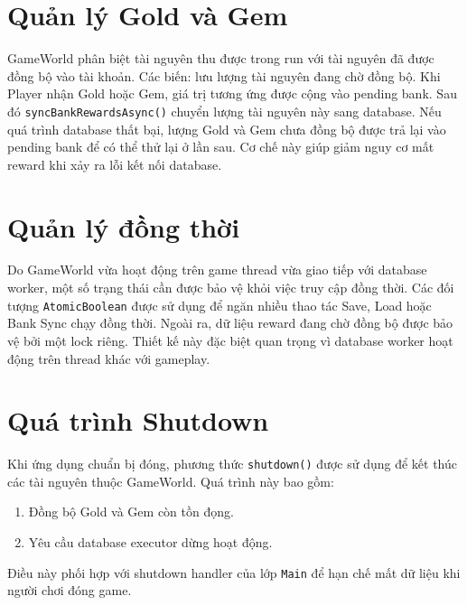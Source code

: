 \documentclass[12pt,a4paper]{report}
\begin{document}
    \section{Quản lý Gold và Gem}
    GameWorld phân biệt tài nguyên thu được trong run với tài nguyên
    đã được đồng bộ vào tài khoản.
    Các biến:
    lưu lượng tài nguyên đang chờ đồng bộ.
    Khi Player nhận Gold hoặc Gem, giá trị tương ứng được cộng vào
    pending bank.
    Sau đó \texttt{syncBankRewardsAsync()} chuyển lượng tài nguyên
    này sang database.
    Nếu quá trình database thất bại, lượng Gold và Gem chưa đồng bộ
    được trả lại vào pending bank để có thể thử lại ở lần sau.
    Cơ chế này giúp giảm nguy cơ mất reward khi xảy ra lỗi kết nối
    database.


    \section{Quản lý đồng thời}
    Do GameWorld vừa hoạt động trên game thread vừa giao tiếp với
    database worker, một số trạng thái cần được bảo vệ khỏi việc
    truy cập đồng thời.
    Các đối tượng \texttt{AtomicBoolean} được sử dụng để ngăn nhiều
    thao tác Save, Load hoặc Bank Sync chạy đồng thời.
    Ngoài ra, dữ liệu reward đang chờ đồng bộ được bảo vệ bởi một
    lock riêng.
    Thiết kế này đặc biệt quan trọng vì database worker hoạt động
    trên thread khác với gameplay.


    \section{Quá trình Shutdown}

    Khi ứng dụng chuẩn bị đóng, phương thức
    \texttt{shutdown()} được sử dụng để kết thúc các tài nguyên
    thuộc GameWorld.
    Quá trình này bao gồm:
    \begin{enumerate}
        \item Đồng bộ Gold và Gem còn tồn đọng.
        \item Yêu cầu database executor dừng hoạt động.
    \end{enumerate}
    Điều này phối hợp với shutdown handler của lớp \texttt{Main}
    để hạn chế mất dữ liệu khi người chơi đóng game.
\end{document}
